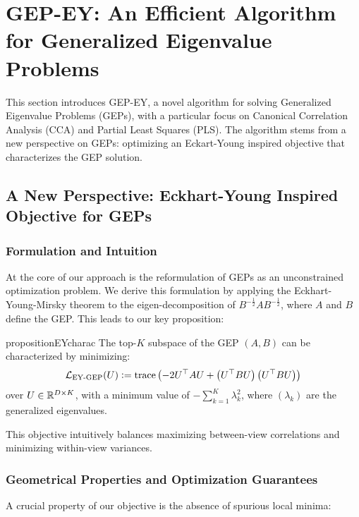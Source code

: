 \section{GEP-EY: An Efficient Algorithm for Generalized Eigenvalue Problems}\label{sec:contributions}
This section introduces GEP-EY, a novel algorithm for solving Generalized Eigenvalue Problems (GEPs), with a particular focus on Canonical Correlation Analysis (CCA) and Partial Least Squares (PLS). The algorithm stems from a new perspective on GEPs: optimizing an Eckart-Young inspired objective that characterizes the GEP solution.

\subsection{A New Perspective: Eckhart-Young Inspired Objective for GEPs}

\subsubsection{Formulation and Intuition}
At the core of our approach is the reformulation of GEPs as an unconstrained optimization problem. We derive this formulation by applying the Eckhart-Young-Mirsky theorem to the eigen-decomposition of $B^{-\frac{1}{2}} A B^{-\frac{1}{2}}$, where $A$ and $B$ define the GEP. This leads to our key proposition:

\begin{restatable}{proposition}{EYcharac}
    \label{prop:EY-charac}
    The top-$K$ subspace of the GEP $(A,B)$ can be characterized by minimizing:
    \begin{align}\label{eq:EY-charac}
    \mathcal{L}_\text{EY-GEP}(U) \vcentcolon= \operatorname{trace} \left( - 2U^\top A U + \left(U^\top B U\right) \left(U^\top B U\right) \right)
    \end{align}
    over $U \in \mathbb{R}^{D \times K}$, with a minimum value of $- \sum_{k=1}^K \lambda_k^2$, where $(\lambda_k)$ are the generalized eigenvalues.
\end{restatable}
    
This objective intuitively balances maximizing between-view correlations and minimizing within-view variances.

\subsubsection{Geometrical Properties and Optimization Guarantees}
A crucial property of our objective is the absence of spurious local minima:

